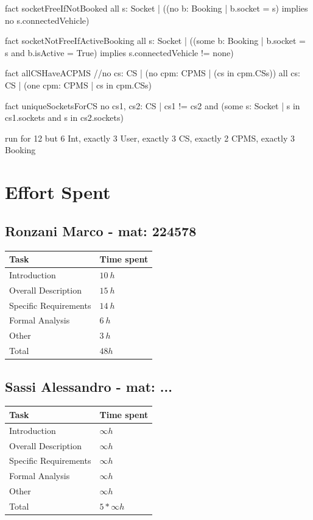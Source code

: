 \documentclass[11pt]{article}
\begin{document}
\begin{ffcode}
    fact socketFreeIfNotBooked {
    	all s: Socket | ((no b: Booking | b.socket = s)
    	implies 
    	no s.connectedVehicle)
    }
    
    fact socketNotFreeIfActiveBooking {
    	all s: Socket | ((some b: Booking | b.socket = s and b.isActive = True)
    	implies 
    	s.connectedVehicle != none)
    }
    
    fact allCSHaveACPMS {
    	//no cs: CS | (no cpm: CPMS | (cs in cpm.CSs))
    	all cs: CS | (one cpm: CPMS | cs in cpm.CSs)
    }
    
    fact uniqueSocketsForCS {
    	no cs1, cs2: CS | cs1 != cs2 and (some s: Socket | s in cs1.sockets and s in cs2.sockets)
    }
    
    run {} for 12 but 6 Int, exactly 3 User, exactly 3 CS, exactly 2 CPMS, exactly 3 Booking
    
\end{ffcode}

\newpage

\section{Effort Spent}
\label{section:effort}

\subsection{Ronzani Marco - mat: 224578}

\begin{tabular}{|l|l|}
    \hline
    \textbf{Task} & \textbf{Time spent} \\
    \hline
    Introduction & $10\ h$ \\
    \hline
    Overall Description & $15\ h$ \\
    \hline
    Specific Requirements & $14\ h$ \\
    \hline
    Formal Analysis & $6\ h$ \\
    \hline
    Other & $3\ h$ \\
    \hline
    \hline
    Total & $48 h$ \\
    \hline
\end{tabular}

\subsection{Sassi Alessandro - mat: ...}

\begin{tabular}{|l|l|}
    \hline
    \textbf{Task} & \textbf{Time spent} \\
    \hline
    Introduction & $\infty h$ \\
    \hline
    Overall Description & $\infty h$ \\
    \hline
    Specific Requirements & $\infty h$ \\
    \hline
    Formal Analysis & $\infty h$ \\
    \hline
    Other & $\infty h$ \\
    \hline
    \hline
    Total & $5*\infty h$ \\
    \hline
\end{tabular}
\end{document}
